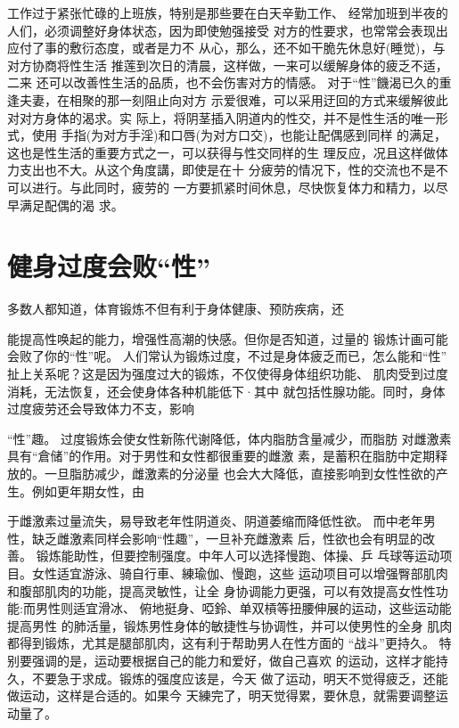 \documentclass[12pt,UTF8]{ctexbook}
\begin{document}
工作过于紧张忙碌的上班族，特别是那些要在白天辛勤工作、
经常加班到半夜的人们，必须调整好身体状态，因为即使勉强接受
对方的性要求，也常常会表现出应付了事的敷衍态度，或者是力不
从心，那么，还不如干脆先休息好(睡觉)，与对方协商将性生活
推莲到次日的清晨，这样做，一来可以缓解身体的疲乏不适，二来
还可以改善性生活的品质，也不会伤害对方的情感。
对于“性”饑渴已久的重逢夫妻，在相聚的那一刻阻止向对方
示爱很难，可以采用迂回的方式来缓解彼此对对方身体的渴求。实
际上，将阴茎插入阴道内的性交，并不是性生活的唯一形式，使用
手指(为对方手淫)和口唇(为对方口交)，也能让配偶感到同样
的满足，这也是性生活的重要方式之一，可以获得与性交同样的生
理反应，况且这样做体力支出也不大。从这个角度講，即使是在十
分疲劳的情况下，性的交流也不是不可以进行。与此同时，疲劳的
一方要抓紧时间休息，尽快恢复体力和精力，以尽早满足配偶的渴
求。

\section{健身过度会败“性”}

多数人都知道，体育锻炼不但有利于身体健康、预防疾病，还

能提高性唤起的能力，增强性高潮的快感。但你是否知道，过量的
锻炼计画可能会败了你的“性”呢。
人们常认为锻炼过度，不过是身体疲乏而已，怎么能和“性”
扯上关系呢？这是因为强度过大的锻炼，不仅使得身体组织功能、
肌肉受到过度消耗，无法恢复，还会使身体各种机能低下·其中
就包括性腺功能。同时，身体过度疲劳还会导致体力不支，影响

“性”趣。
过度锻炼会使女性新陈代谢降低，体内脂肪含量减少，而脂肪
对雌激素具有“倉储”的作用。对于男性和女性都很重要的雌激
素，是蓄积在脂肪中定期释放的。一旦脂肪减少，雌激素的分泌量
也会大大降低，直接影响到女性性欲的产生。例如更年期女性，由

于雌激素过量流失，易导致老年性阴道炎、阴道萎缩而降低性欲。
而中老年男性，缺乏雌激素同样会影响“性趣”，一旦补充雌激素
后，性欲也会有明显的改善。
锻炼能助性，但要控制强度。中年人可以选择慢跑、体操、乒
乓球等运动项目。女性适宜游泳、骑自行車、練瑜伽、慢跑，这些
运动项目可以增强臀部肌肉和腹部肌肉的功能，提高灵敏性，让全
身协调能力更强，可以有效提高女性性功能:而男性则适宜滑冰、
俯地挺身、啞鈴、单双槓等扭腰伸展的运动，这些运动能提高男性
的肺活量，锻炼男性身体的敏捷性与协调性，并可以使男性的全身
肌肉都得到锻炼，尤其是腿部肌肉，这有利于帮助男人在性方面的
“战斗”更持久。
特别要强调的是，运动要根据自己的能力和爱好，做自己喜欢
的运动，这样才能持久，不要急于求成。锻炼的强度应该是，今天
做了运动，明天不觉得疲乏，还能做运动，这样是合适的。如果今
天練完了，明天觉得累，要休息，就需要调整运动量了。
\end{document}
